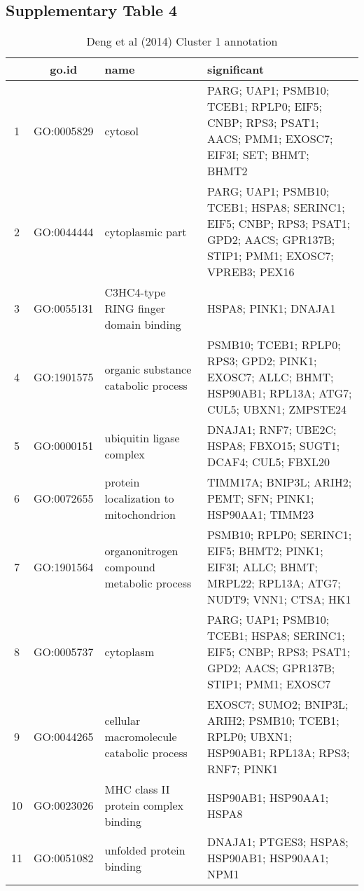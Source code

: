 \subsection{Supplementary Table 4}
\begin{table}[htp]
\begin{center}
\caption{Deng et al (2014) Cluster 1 annotation} \label{tab:tab5}
\begin{tabular}{|c|c|p{1.5in}|p{4in}|}
  \hline
 & go.id & name & significant \\ 
  \hline
1 & GO:0005829 & cytosol & \footnotesize{PARG; UAP1; PSMB10; TCEB1; RPLP0; EIF5; CNBP; RPS3; PSAT1; AACS; PMM1; EXOSC7; EIF3I; SET; BHMT; BHMT2} \\ 
  2 & GO:0044444 & cytoplasmic part & \footnotesize{PARG; UAP1; PSMB10; TCEB1; HSPA8; SERINC1; EIF5; CNBP; RPS3; PSAT1; GPD2; AACS; GPR137B; STIP1; PMM1; EXOSC7; VPREB3; PEX16} \\ 
  3 & GO:0055131 & C3HC4-type RING finger domain binding & \footnotesize{HSPA8; PINK1; DNAJA1} \\ 
  4 & GO:1901575 & organic substance catabolic process & \footnotesize{PSMB10; TCEB1; RPLP0; RPS3; GPD2; PINK1; EXOSC7; ALLC; BHMT; HSP90AB1; RPL13A; ATG7; CUL5; UBXN1; ZMPSTE24} \\ 
  5 & GO:0000151 & ubiquitin ligase complex & \footnotesize{DNAJA1; RNF7; UBE2C; HSPA8; FBXO15; SUGT1; DCAF4; CUL5; FBXL20} \\ 
  6 & GO:0072655 & protein localization to mitochondrion & \footnotesize{TIMM17A; BNIP3L; ARIH2; PEMT; SFN; PINK1; HSP90AA1; TIMM23} \\ 
  7 & GO:1901564 & organonitrogen compound metabolic process & \footnotesize{PSMB10; RPLP0; SERINC1; EIF5; BHMT2; PINK1; EIF3I; ALLC; BHMT; MRPL22; RPL13A; ATG7; NUDT9; VNN1; CTSA; HK1} \\ 
  8 & GO:0005737 & cytoplasm & \footnotesize{PARG; UAP1; PSMB10; TCEB1; HSPA8; SERINC1; EIF5; CNBP; RPS3; PSAT1; GPD2; AACS; GPR137B; STIP1; PMM1; EXOSC7} \\ 
  9 & GO:0044265 & cellular macromolecule catabolic process & \footnotesize{EXOSC7; SUMO2; BNIP3L; ARIH2; PSMB10; TCEB1; RPLP0; UBXN1; HSP90AB1; RPL13A; RPS3; RNF7; PINK1} \\ 
10 & GO:0023026 & MHC class II protein complex binding & \footnotesize{HSP90AB1; HSP90AA1; HSPA8} \\ 
11 & GO:0051082 & unfolded protein binding & \footnotesize{DNAJA1; PTGES3; HSPA8; HSP90AB1; HSP90AA1; NPM1} \\ 

\end{tabular}
\end{center}
\end{table}
